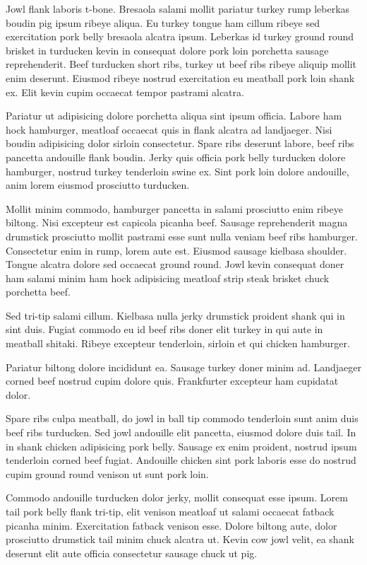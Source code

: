 \documentclass[a4paper,10pt]{article}
\begin{document}
Jowl flank laboris t-bone. Bresaola salami mollit pariatur turkey rump leberkas boudin pig ipsum ribeye aliqua. Eu turkey tongue ham cillum ribeye sed exercitation pork belly bresaola alcatra ipsum. Leberkas id turkey ground round brisket in turducken kevin in consequat dolore pork loin porchetta sausage reprehenderit. Beef turducken short ribs, turkey ut beef ribs ribeye aliquip mollit enim deserunt. Eiusmod ribeye nostrud exercitation eu meatball pork loin shank ex. Elit kevin cupim occaecat tempor pastrami alcatra.

Pariatur ut adipisicing dolore porchetta aliqua sint ipsum officia. Labore ham hock hamburger, meatloaf occaecat quis in flank alcatra ad landjaeger. Nisi boudin adipisicing dolor sirloin consectetur. Spare ribs deserunt labore, beef ribs pancetta andouille flank boudin. Jerky quis officia pork belly turducken dolore hamburger, nostrud turkey tenderloin swine ex. Sint pork loin dolore andouille, anim lorem eiusmod prosciutto turducken.

Mollit minim commodo, hamburger pancetta in salami prosciutto enim ribeye biltong. Nisi excepteur est capicola picanha beef. Sausage reprehenderit magna drumstick prosciutto mollit pastrami esse sunt nulla veniam beef ribs hamburger. Consectetur enim in rump, lorem aute est. Eiusmod sausage kielbasa shoulder. Tongue alcatra dolore sed occaecat ground round. Jowl kevin consequat doner ham salami minim ham hock adipisicing meatloaf strip steak brisket chuck porchetta beef.

Sed tri-tip salami cillum. Kielbasa nulla jerky drumstick proident shank qui in sint duis. Fugiat commodo eu id beef ribs doner elit turkey in qui aute in meatball shitaki. Ribeye excepteur tenderloin, sirloin et qui chicken hamburger.

Pariatur biltong dolore incididunt ea. Sausage turkey doner minim ad. Landjaeger corned beef nostrud cupim dolore quis. Frankfurter excepteur ham cupidatat dolor.

Spare ribs culpa meatball, do jowl in ball tip commodo tenderloin sunt anim duis beef ribs turducken. Sed jowl andouille elit pancetta, eiusmod dolore duis tail. In in shank chicken adipisicing pork belly. Sausage ex enim proident, nostrud ipsum tenderloin corned beef fugiat. Andouille chicken sint pork laboris esse do nostrud cupim ground round venison ut sunt pork loin.

Commodo andouille turducken dolor jerky, mollit consequat esse ipsum. Lorem tail pork belly flank tri-tip, elit venison meatloaf ut salami occaecat fatback picanha minim. Exercitation fatback venison esse. Dolore biltong aute, dolor prosciutto drumstick tail minim chuck alcatra ut. Kevin cow jowl velit, ea shank deserunt elit aute officia consectetur sausage chuck ut pig.
\end{document}
